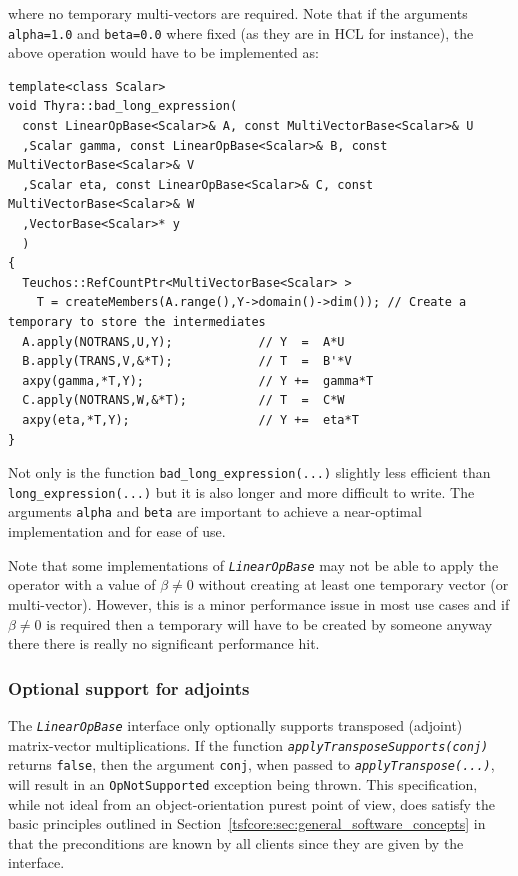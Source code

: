 \documentclass[pdf,ps2pdf,11pt]{SANDreport}
\begin{document}
{}\noindent{}where no temporary multi-vectors are required.  Note that if the
arguments {}\texttt{alpha=1.0} and {}\texttt{beta=0.0} where fixed (as they
are in HCL for instance), the above operation would have to be implemented as:

{\scriptsize\begin{verbatim}
template<class Scalar>
void Thyra::bad_long_expression(
  const LinearOpBase<Scalar>& A, const MultiVectorBase<Scalar>& U
  ,Scalar gamma, const LinearOpBase<Scalar>& B, const MultiVectorBase<Scalar>& V
  ,Scalar eta, const LinearOpBase<Scalar>& C, const MultiVectorBase<Scalar>& W
  ,VectorBase<Scalar>* y
  )
{
  Teuchos::RefCountPtr<MultiVectorBase<Scalar> >
    T = createMembers(A.range(),Y->domain()->dim()); // Create a temporary to store the intermediates
  A.apply(NOTRANS,U,Y);            // Y  =  A*U
  B.apply(TRANS,V,&*T);            // T  =  B'*V
  axpy(gamma,*T,Y);                // Y +=  gamma*T
  C.apply(NOTRANS,W,&*T);          // T  =  C*W
  axpy(eta,*T,Y);                  // Y +=  eta*T
}
\end{verbatim}}

Not only is the function {}\texttt{bad\-\_long\-\_expression(\-...)}
slightly less efficient than {}\texttt{long\-\_expression(\-...)} but
it is also longer and more difficult to write.  The arguments
{}\texttt{alpha} and {}\texttt{beta} are important to achieve a
near-optimal implementation and for ease of use.

Note that some implementations of {}\texttt{\textit{Linear\-Op\-Base}} may not
be able to apply the operator with a value of $\beta {}\ne 0$ without creating
at least one temporary vector (or multi-vector).  However, this is a minor
performance issue in most use cases and if $\beta {}\ne 0$ is required then a
temporary will have to be created by someone anyway there there is really no
significant performance hit.

%
\subsubsection{Optional support for adjoints}
\label{tsfcore:sec:linear_op_adjoints}
%

The {}\texttt{\textit{Linear\-Op\-Base}} interface only optionally supports
transposed (adjoint) matrix-vector multiplications.  If the function
{}\texttt{\textit{applyTransposeSupports(conj)}} returns {}\texttt{false},
then the argument {}\texttt{conj}, when passed to
{}\texttt{\textit{apply\-Transpose(\-...)}}, will result in an
{}\texttt{Op\-Not\-Supported} exception being thrown.  This specification,
while not ideal from an object-orientation purest point of view, does satisfy
the basic principles outlined in
Section~\ref{tsfcore:sec:general_software_concepts} in that the preconditions
are known by all clients since they are given by the interface.
\end{document}
